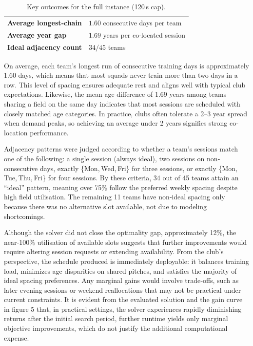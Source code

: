 \documentclass[12pt]{article}
\begin{document}
\begin{table}[h]
  \centering
  \def\arraystretch{1.3}
  \begin{tabularx}{0.75\textwidth}{l X}
    \hline
    \textbf{Average longest‐chain}  & $1.60$ consecutive days per team \\
    \textbf{Average year gap}       & $1.69$ years per co‐located session \\
    \textbf{Ideal adjacency count}  & $34/45$ teams \\
    \hline
  \end{tabularx}
  \caption{Key outcomes for the full instance (120 s cap).}
  \label{tab:full‐metrics}
\end{table}

On average, each team’s longest run of consecutive training days is approximately 1.60 days, which means that most squads never train more than two days in a row. This level of spacing ensures adequate rest and aligns well with typical club expectations. Likewise, the mean age difference of 1.69 years among teams sharing a field on the same day indicates that most sessions are scheduled with closely matched age categories. In practice, clubs often tolerate a 2–3 year spread when demand peaks, so achieving an average under 2 years signifies strong co‐location performance.

Adjacency patterns were judged according to whether a team’s sessions match one of the following: a single session (always ideal), two sessions on non‐consecutive days, exactly \{Mon, Wed, Fri\} for three sessions, or exactly \{Mon, Tue, Thu, Fri\} for four sessions. By these criteria, 34 out of 45 teams attain an “ideal” pattern, meaning over 75\% follow the preferred weekly spacing despite high field utilisation. The remaining 11 teams have non‐ideal spacing only because there was no alternative slot available, not due to modeling shortcomings.

Although the solver did not close the optimality gap, approximately 12\%, the near‐100\% utilisation of available slots suggests that further improvements would require altering session requests or extending availability. From the club’s perspective, the schedule produced is immediately deployable: it balances training load, minimizes age disparities on shared pitches, and satisfies the majority of ideal spacing preferences. Any marginal gains would involve trade‐offs, such as later evening sessions or weekend reallocations that may not be practical under current constraints. It is evident from the evaluated solution and the gain curve in figure 5 that, in practical settings, the solver experiences rapidly diminishing returns after the initial search period, further runtime yields only marginal objective improvements, which do not justify the additional computational expense.
\end{document}
